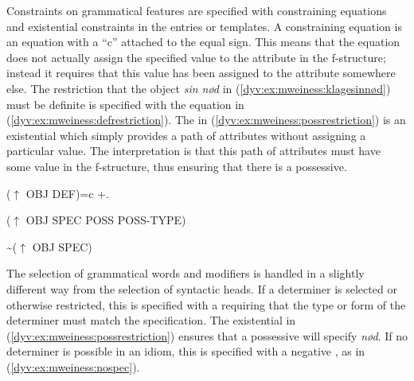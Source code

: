 \documentclass[output=paper]{langsci/langscibook}
\begin{document}

Constraints on grammatical features are specified with constraining equations and existential constraints in the entries or templates.
A constraining equation is an equation with a ``\textsf{c}'' attached to the equal sign.
This means that the equation does not actually assign the specified value to the attribute in the f-structure; instead it requires that this value has been assigned to the attribute somewhere else.
The restriction that the object \emph{sin nød} in (\ref{dyv:ex:mweiness:klagesinnød}) must be definite is specified with the equation in (\ref{dyv:ex:mweiness:defrestriction}).
The  in (\ref{dyv:ex:mweiness:possrestriction}) is an existential  which simply provides  a path of attributes without assigning a particular value.
The interpretation is that this path of attributes must have some value in the f-structure, thus ensuring that there is a possessive.

\ea\label{dyv:ex:mweiness:defrestriction}
{\sffamily 
($\uparrow$ OBJ DEF)=c +.
}
\z

\ea\label{dyv:ex:mweiness:possrestriction}
{\sffamily 
($\uparrow$ OBJ SPEC POSS POSS-TYPE) \\
}
\z


\ea\label{dyv:ex:mweiness:nospec}
{\sffamily 
{\textasciitilde}($\uparrow$ OBJ SPEC) \\
}
\z

The selection of grammatical words and modifiers is handled in a slightly different way from the selection of syntactic heads.
If a determiner is selected or otherwise restricted, this is specified with a  requiring that the type or form of the determiner must match the specification.
The existential  in (\ref{dyv:ex:mweiness:possrestriction}) ensures that a possessive will specify \emph{nød}.
If no determiner is possible in an idiom, this is specified with a negative , as in (\ref{dyv:ex:mweiness:nospec}).
\end{document}
